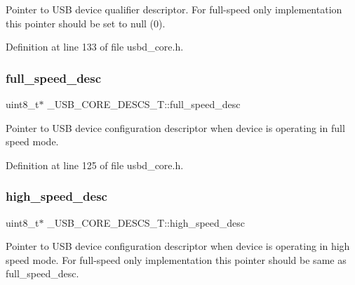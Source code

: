 Pointer to U\+SB device qualifier descriptor. For full-\/speed only implementation this pointer should be set to null (0). 

Definition at line 133 of file usbd\+\_\+core.\+h.

\mbox{\label{struct___u_s_b___c_o_r_e___d_e_s_c_s___t_adc04768aaa60355fd9934895955b7439}} 
\subsubsection{\texorpdfstring{full\+\_\+speed\+\_\+desc}{full\_speed\_desc}}
{\footnotesize\ttfamily uint8\+\_\+t$\ast$ \+\_\+\+U\+S\+B\+\_\+\+C\+O\+R\+E\+\_\+\+D\+E\+S\+C\+S\+\_\+\+T\+::full\+\_\+speed\+\_\+desc}

Pointer to U\+SB device configuration descriptor when device is operating in full speed mode. 

Definition at line 125 of file usbd\+\_\+core.\+h.

\mbox{\label{struct___u_s_b___c_o_r_e___d_e_s_c_s___t_a99f740c42483df30cc2924383c8a4d2b}} 
\subsubsection{\texorpdfstring{high\+\_\+speed\+\_\+desc}{high\_speed\_desc}}
{\footnotesize\ttfamily uint8\+\_\+t$\ast$ \+\_\+\+U\+S\+B\+\_\+\+C\+O\+R\+E\+\_\+\+D\+E\+S\+C\+S\+\_\+\+T\+::high\+\_\+speed\+\_\+desc}

Pointer to U\+SB device configuration descriptor when device is operating in high speed mode. For full-\/speed only implementation this pointer should be same as full\+\_\+speed\+\_\+desc. 

